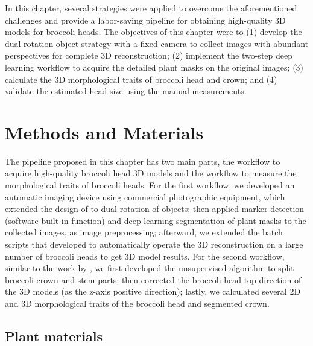 In this chapter, several strategies were applied to overcome the aforementioned challenges and provide a labor-saving pipeline for obtaining high-quality 3D models for broccoli heads. The objectives of this chapter were to (1) develop the dual-rotation object strategy with a fixed camera to collect images with abundant perspectives for complete 3D reconstruction; (2) implement the two-step deep learning workflow to acquire the detailed plant masks on the original images; (3) calculate the 3D morphological traits of broccoli head and crown; and (4) validate the estimated head size using the manual measurements. 


\section{Methods and Materials}

The pipeline proposed in this chapter has two main parts, the workflow to acquire high-quality broccoli head 3D models and the workflow to measure the morphological traits of broccoli heads. For the first workflow, we developed an automatic imaging device using commercial photographic equipment, which extended the design of \citet{kochi_3d_2018} to dual-rotation of objects; then applied marker detection (software built-in function) and deep learning segmentation of plant masks to the collected images, as image preprocessing; afterward, we extended the batch scripts that \citet{feldman_easydcp_2021} developed to automatically operate the 3D reconstruction on a large number of broccoli heads to get 3D model results. For the second workflow, similar to the work by \citet{feldman_easydcp_2021}, we first developed the unsupervised algorithm to split broccoli crown and stem parts; then corrected the broccoli head top direction of the 3D models (as the z-axis positive direction); lastly, we calculated several 2D and 3D morphological traits of the broccoli head and segmented crown.

\subsection{Plant materials} \label{sec:2022plot}

